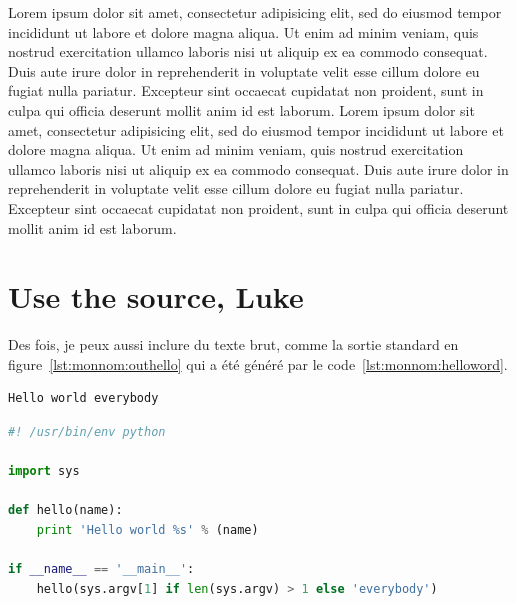 Lorem ipsum dolor sit amet, consectetur adipisicing elit, sed do
eiusmod tempor incididunt ut labore et dolore magna aliqua. Ut enim ad
minim veniam, quis nostrud exercitation ullamco laboris nisi ut
aliquip ex ea commodo consequat. Duis aute irure dolor in
reprehenderit in voluptate velit esse cillum dolore eu fugiat nulla
pariatur. Excepteur sint occaecat cupidatat non proident, sunt in
culpa qui officia deserunt mollit anim id est laborum. Lorem ipsum
dolor sit amet, consectetur adipisicing elit, sed do eiusmod tempor
incididunt ut labore et dolore magna aliqua. Ut enim ad minim veniam,
quis nostrud exercitation ullamco laboris nisi ut aliquip ex ea
commodo consequat. Duis aute irure dolor in reprehenderit in voluptate
velit esse cillum dolore eu fugiat nulla pariatur. Excepteur sint
occaecat cupidatat non proident, sunt in culpa qui officia deserunt
mollit anim id est laborum.

\section{Use the source, Luke}


Des fois, je peux aussi inclure du texte brut, comme la sortie
standard en figure~\ref{lst:monnom:outhello} qui a été généré par le
code~\ref{lst:monnom:helloword}.

\begin{lstlisting}[language={},caption={Sortie standard},label={lst:monnom:outhello}]
Hello world everybody
\end{lstlisting}

\begin{lstlisting}[language={Python},caption={Mon premier code},label={lst:monnom:helloword}]
#! /usr/bin/env python

import sys

def hello(name):
    print 'Hello world %s' % (name)

if __name__ == '__main__':
    hello(sys.argv[1] if len(sys.argv) > 1 else 'everybody')
\end{lstlisting}



